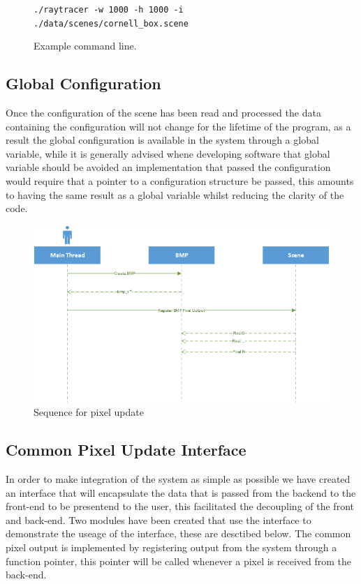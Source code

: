\begin{figure}[h]
\texttt{./raytracer -w 1000 -h 1000 -i ./data/scenes/cornell\_box.scene}
\caption{Example command line.}
\end{figure}

\subsection{Global Configuration}
Once the configuration of the scene has been read and processed the data containing the configuration will not change for
the lifetime of the program, as a result the global configuration is available in the system through a global variable, while
it is generally advised whene developing software that global variable should be avoided an implementation that passed the
configuration would require that a pointer to a configuration structure be passed, this amounts to having the same result
as a global variable whilst reducing the clarity of the code.

\begin{figure}
\centering
\includegraphics[width=\textwidth]{./images/pixel_update_sequence.png}
\caption{Sequence for pixel update}
\end{figure}

\subsection{Common Pixel Update Interface}
In order to make integration of the system as simple as possible we have created an interface that will encapsulate the data
that is passed from the backend to the front-end to be presentend to the user, this facilitated the decoupling of the front
and back-end. Two modules have been created that use the interface to demonstrate the useage of the interface, these are
desctibed below. The common pixel output is implemented by registering output from the system through a function pointer,
this pointer will be called whenever a pixel is received from the back-end.

